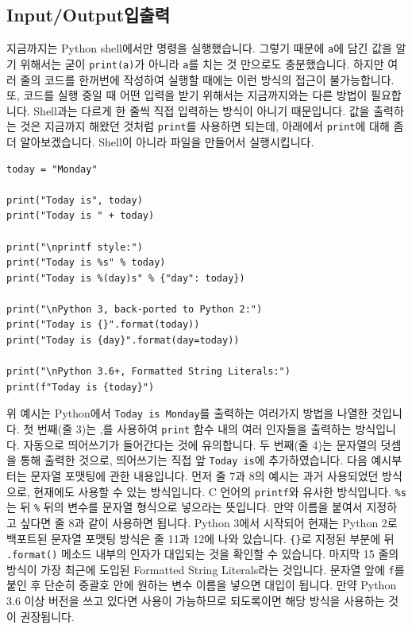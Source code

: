 \documentclass[../main.tex]{subfiles}
\begin{document}
\subsection{Input/Output입출력}
지금까지는 Python shell에서만 명령을 실행했습니다.
그렇기 때문에 \texttt{a}에 담긴 값을 알기 위해서는 굳이 \texttt{print(a)}가 아니라 \texttt{a}를 치는 것 만으로도 충분했습니다.
하지만 여러 줄의 코드를 한꺼번에 작성하여 실행할 때에는 이런 방식의 접근이 불가능합니다.
또, 코드를 실행 중일 때 어떤 입력을 받기 위해서는 지금까지와는 다른 방법이 필요합니다.
Shell과는 다르게 한 줄씩 직접 입력하는 방식이 아니기 때문입니다.
값을 출력하는 것은 지금까지 해왔던 것처럼 \texttt{print}를 사용하면 되는데, 아래에서 \texttt{print}에 대해 좀 더 알아보겠습니다.
Shell이 아니라 파일을 만들어서 실행시킵니다.
\begin{verbatim}
today = "Monday"

print("Today is", today)
print("Today is " + today)

print("\nprintf style:")
print("Today is %s" % today)
print("Today is %(day)s" % {"day": today})

print("\nPython 3, back-ported to Python 2:")
print("Today is {}".format(today))
print("Today is {day}".format(day=today))

print("\nPython 3.6+, Formatted String Literals:")
print(f"Today is {today}")
\end{verbatim}
위 예시는 Python에서 \texttt{Today is Monday}를 출력하는 여러가지 방법을 나열한 것입니다.
첫 번째(줄 3)는 ,를 사용하여 \texttt{print} 함수 내의 여러 인자들을 출력하는 방식입니다.
자동으로 띄어쓰기가 들어간다는 것에 유의합니다.
두 번째(줄 4)는 문자열의 덧셈을 통해 출력한 것으로, 띄어쓰기는 직접 앞 \texttt{Today is}에 추가하였습니다.
다음 예시부터는 문자열 포맷팅에 관한 내용입니다.
먼저 줄 7과 8의 예시는 과거 사용되었던 방식으로, 현재에도 사용할 수 있는 방식입니다.
C 언어의 \texttt{printf}와 유사한 방식입니다.
\texttt{\%s}는 뒤 \texttt{\%} 뒤의 변수를 문자열 형식으로 넣으라는 뜻입니다.
만약 이름을 붙여서 지정하고 싶다면 줄 8과 같이 사용하면 됩니다.
Python 3에서 시작되어 현재는 Python 2로 백포트된 문자열 포맷팅 방식은 줄 11과 12에 나와 있습니다.
\texttt{\{\}}로 지정된 부분에 뒤 \texttt{.format()} 메소드 내부의 인자가 대입되는 것을 확인할 수 있습니다.
마지막 15 줄의 방식이 가장 최근에 도입된 Formatted String Literals라는 것입니다.
문자열 앞에 \texttt{f}를 붙인 후 단순히 중괄호 안에 원하는 변수 이름을 넣으면 대입이 됩니다.
만약 Python 3.6 이상 버전을 쓰고 있다면 사용이 가능하므로 되도록이면 해당 방식을 사용하는 것이 권장됩니다.
\end{document}
